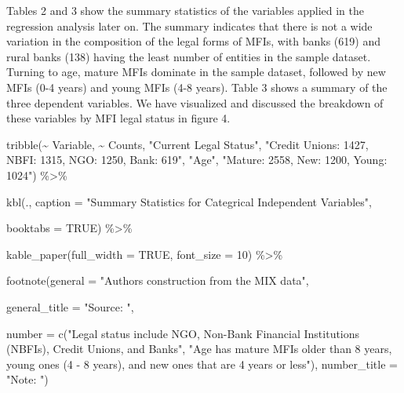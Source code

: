 \documentclass[a4paper,nobind]{templates/ociamthesis}
\newenvironment{Shaded}{\begin{snugshade}}{\end{snugshade}}
\newcommand{\AttributeTok}[1]{\textcolor[rgb]{0.77,0.63,0.00}{#1}}
\newcommand{\ConstantTok}[1]{\textcolor[rgb]{0.00,0.00,0.00}{#1}}
\newcommand{\DecValTok}[1]{\textcolor[rgb]{0.00,0.00,0.81}{#1}}
\newcommand{\FunctionTok}[1]{\textcolor[rgb]{0.00,0.00,0.00}{#1}}
\newcommand{\NormalTok}[1]{#1}
\newcommand{\SpecialCharTok}[1]{\textcolor[rgb]{0.00,0.00,0.00}{#1}}
\newcommand{\StringTok}[1]{\textcolor[rgb]{0.31,0.60,0.02}{#1}}
\renewenvironment{Shaded}
{
  \vspace{10pt}%
  \begin{snugshade}%
}{%
  \end{snugshade}%
  \vspace{8pt}%
}
\begin{document}
Tables 2 and 3 show the summary statistics of the variables applied in the regression analysis later on. The summary indicates that there is not a wide variation in the composition of the legal forms of MFIs, with banks (619) and rural banks (138) having the least number of entities in the sample dataset. Turning to age, mature MFIs dominate in the sample dataset, followed by new MFIs (0-4 years) and young MFIs (4-8 years). Table 3 shows a summary of the three dependent variables. We have visualized and discussed the breakdown of these variables by MFI legal status in figure 4.

\begin{Shaded}
\begin{Highlighting}[]
\FunctionTok{tribble}\NormalTok{(}\SpecialCharTok{\textasciitilde{}}\NormalTok{ Variable, }\SpecialCharTok{\textasciitilde{}}\NormalTok{ Counts,}
          \StringTok{"Current Legal Status"}\NormalTok{, }\StringTok{"Credit Unions: 1427, NBFI: 1315, NGO: 1250, Bank: 619"}\NormalTok{,}
          \StringTok{"Age"}\NormalTok{, }\StringTok{"Mature: 2558, New: 1200, Young: 1024"}\NormalTok{) }\SpecialCharTok{\%\textgreater{}\%} 
  
  \FunctionTok{kbl}\NormalTok{(., }\AttributeTok{caption =} \StringTok{"Summary Statistics for Categrical Independent Variables"}\NormalTok{, }
      
      \AttributeTok{booktabs =} \ConstantTok{TRUE}\NormalTok{) }\SpecialCharTok{\%\textgreater{}\%} 
  
  \FunctionTok{kable\_paper}\NormalTok{(}\AttributeTok{full\_width =} \ConstantTok{TRUE}\NormalTok{, }\AttributeTok{font\_size =} \DecValTok{10}\NormalTok{) }\SpecialCharTok{\%\textgreater{}\%} 
  
  \FunctionTok{footnote}\NormalTok{(}\AttributeTok{general =} \StringTok{"Authors\textquotesingle{} construction from the MIX data"}\NormalTok{,}
           
           \AttributeTok{general\_title =} \StringTok{"Source: "}\NormalTok{,}
           
           \AttributeTok{number =} \FunctionTok{c}\NormalTok{(}\StringTok{"Legal status include NGO, Non{-}Bank Financial Institutions (NBFIs), Credit Unions, and Banks"}\NormalTok{, }\StringTok{"Age has mature MFIs older than 8 years, young ones (4 {-} 8 years), and new ones that are 4 years or less"}\NormalTok{),}
           \AttributeTok{number\_title =} \StringTok{"Note: "}\NormalTok{)}
\end{Highlighting}
\end{Shaded}
\end{document}
